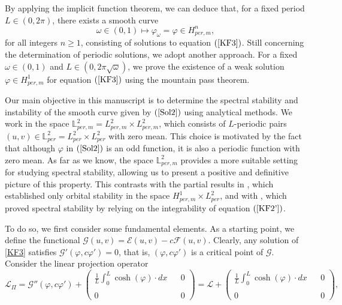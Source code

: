 \documentclass[12pt,reqno,a4paper]{amsart} %
\numberwithin{equation}{section}
\numberwithin{figure}{section}
\begin{document}
By applying the implicit function theorem, we can deduce that, for a fixed period $L \in (0,2\pi)$, there exists a smooth curve
 $$\omega\in (0,1)\mapsto\varphi_{\omega}=\varphi\in H_{per,m}^n,$$ for all integers $n \geq 1$, consisting of solutions to equation $(\ref{KF3})$. Still concerning the determination of periodic solutions, we adopt another approach. For a fixed $\omega \in (0,1)$ and $L\in (0,2\pi\sqrt{\omega})$, we prove the existence of a weak solution $\varphi\in H_{per,m}^1$ for equation $(\ref{KF3})$ using the mountain pass theorem.
 
 Our main objective in this manuscript is to determine the spectral stability and instability of the smooth curve given by $(\ref{Sol2})$ using analytical methods. We work in the space $\mathbb{L}_{per,m}^2=L_{per,m}^2\times L_{per,m}^2$, which consists of $L$-periodic pairs $(u,v)\in\mathbb{L}_{per}^2= L_{per}^2\times L_{per}^2$ with zero mean. This choice is motivated by the fact that although $\varphi$ in $(\ref{Sol2})$ is an odd function, it is also a periodic function with zero mean. As far as we know, the space $\mathbb{L}_{per,m}^2$ provides a more suitable setting for studying spectral stability, allowing us to present a positive and definitive picture of this property. This contrasts with the partial results in \cite{Natali2011}, which established only orbital stability in the space $H^1_{per,m}\times L^2_{per}$, and with \cite{Deconinck}, which proved spectral stability by relying on the integrability of equation $(\ref{KF2'})$.
 
  To do so, we first consider some fundamental elements. As a starting point, we define the functional
$\mathcal{G}(u, v)=\mathcal{E}(u, v)-c\mathcal{F}(u, v).$ Clearly, any solution of \eqref{KF3} satisfies $\mathcal{G}'(\varphi,c\varphi')=0$, that is, $(\varphi,c\varphi')$ is a critical point of $\mathcal{G}$. Consider the linear projection operator  
\begin{equation}\displaystyle\label{opconstrained2}\mathcal{L}_{\Pi}= \mathcal{G}''(\varphi,c\varphi')+\displaystyle \left(
\displaystyle	\begin{array}{ccc}
		\frac{1}{L}\int_{0}^{L}\cosh(\varphi)\cdot  dx& & 0 \\\\
		0  & & 0
	\end{array}\right)=\displaystyle\mathcal{L}+\displaystyle \left(
\begin{array}{ccc}
\frac{1}{L}\int_{0}^{L}\cosh(\varphi)\cdot  dx & & 0 \\\\
0  & & 0
\end{array}\right),\end{equation} 
\end{document}
